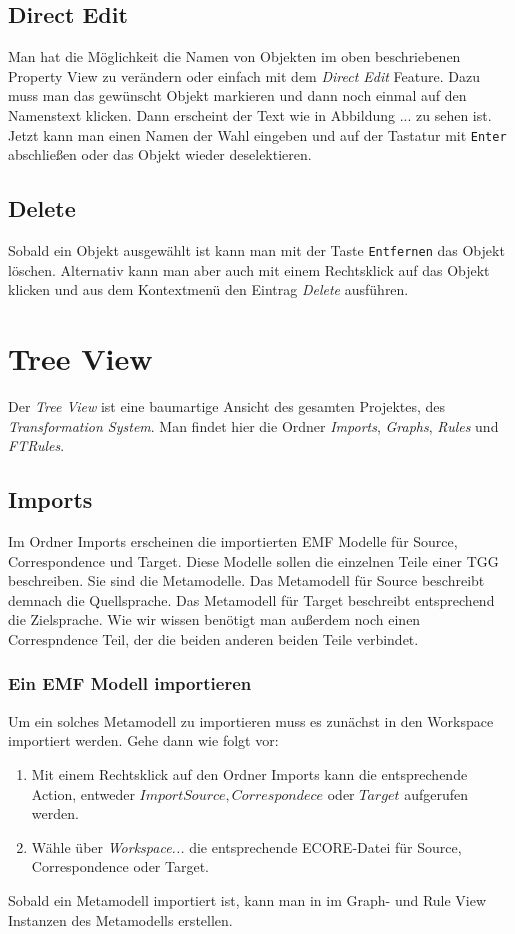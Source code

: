 \subsection{Direct Edit}
Man hat die Möglichkeit die Namen von Objekten im oben beschriebenen Property View zu verändern oder einfach mit dem \emph{Direct Edit} Feature. Dazu muss man das gewünscht Objekt markieren und dann noch einmal auf den Namenstext klicken. Dann erscheint der Text wie in Abbildung ... zu sehen ist. Jetzt kann man einen Namen der Wahl eingeben und auf der Tastatur mit \texttt{Enter} abschließen oder das Objekt wieder deselektieren. 

\subsection{Delete}
Sobald ein Objekt ausgewählt ist kann man mit der Taste \texttt{Entfernen} das Objekt löschen. Alternativ kann man aber auch mit einem Rechtsklick auf das Objekt klicken und aus dem Kontextmenü den Eintrag \textit{Delete} ausführen.

\section{Tree View}
Der \emph{Tree View} ist eine baumartige Ansicht des gesamten Projektes, des \emph{Transformation System}. Man findet hier die Ordner \emph{Imports}, \emph{Graphs}, \emph{Rules} und \emph{FTRules}.

\subsection{Imports}
Im Ordner Imports erscheinen die importierten EMF Modelle für Source, Correspondence und Target. Diese Modelle sollen die einzelnen Teile einer TGG beschreiben. Sie sind die Metamodelle. Das Metamodell für Source beschreibt demnach die Quellsprache. Das Metamodell für Target beschreibt entsprechend die Zielsprache. Wie wir wissen benötigt man außerdem noch einen Correspndence Teil, der die beiden anderen beiden Teile verbindet. 

\subsubsection{Ein EMF Modell importieren}
Um ein solches Metamodell zu importieren muss es zunächst in den Workspace importiert werden. Gehe dann wie folgt vor: 
\begin{enumerate}
	\item Mit einem Rechtsklick auf den Ordner Imports kann die entsprechende Action, entweder $Import Source, Correspondece$ oder $Target$ aufgerufen werden.
	\item Wähle über \textit{Workspace...} die entsprechende ECORE-Datei für Source, Correspondence oder Target.
\end{enumerate}
Sobald ein Metamodell importiert ist, kann man in im Graph- und Rule View Instanzen des Metamodells erstellen.


